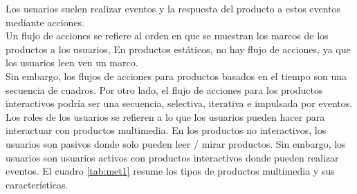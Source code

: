 Los usuarios suelen realizar eventos y la respuesta del producto a estos eventos mediante acciones.\\
Un flujo de acciones se refiere al orden en que se muestran los marcos de los productos a los usuarios, En productos est\'aticos, no hay flujo de acciones, ya que los usuarios leen 
ven un marco.\\ 
Sin embargo, los flujos de acciones para productos basados en el tiempo son una secuencia de cuadros. Por otro lado, el flujo de acciones 
para los productos interactivos podría ser una secuencia, selectiva, iterativa e impulsada por eventos\cite{aleem2016game,cartwright1996pre}.\\
Los roles de los usuarios se refieren a lo que los usuarios pueden hacer para interactuar con productos multimedia. En los productos no interactivos, los usuarios son pasivos donde 
solo pueden leer / mirar productos. Sin embargo, los usuarios son usuarios activos con productos interactivos donde pueden realizar eventos. El cuadro \ref{tab:met1}  resume los tipos de productos 
multimedia y sus características.
\begin{table}[H]
  \caption{Características de los productos multimedia.}
  \label{tab:met1}
  \end{table}

